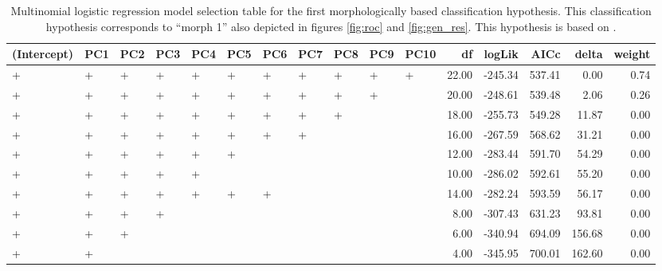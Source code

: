 \documentclass[12pt,letterpaper]{article}\usepackage{graphicx, color}
\begin{document}



\pagebreak

\begin{table}
  \centering
{\small
\begin{tabular}{lllllllllllrrrrr}
  \hline
(Intercept) & PC1 & PC2 & PC3 & PC4 & PC5 & PC6 & PC7 & PC8 & PC9 & PC10 & df & logLik & AICc & delta & weight \\ 
  \hline
+ & + & + & + & + & + & + & + & + & + & + & 22.00 & -245.34 & 537.41 & 0.00 & 0.74 \\ 
  + & + & + & + & + & + & + & + & + & + &  & 20.00 & -248.61 & 539.48 & 2.06 & 0.26 \\ 
  + & + & + & + & + & + & + & + & + &  &  & 18.00 & -255.73 & 549.28 & 11.87 & 0.00 \\ 
  + & + & + & + & + & + & + & + &  &  &  & 16.00 & -267.59 & 568.62 & 31.21 & 0.00 \\ 
  + & + & + & + & + & + &  &  &  &  &  & 12.00 & -283.44 & 591.70 & 54.29 & 0.00 \\ 
  + & + & + & + & + &  &  &  &  &  &  & 10.00 & -286.02 & 592.61 & 55.20 & 0.00 \\ 
  + & + & + & + & + & + & + &  &  &  &  & 14.00 & -282.24 & 593.59 & 56.17 & 0.00 \\ 
  + & + & + & + &  &  &  &  &  &  &  & 8.00 & -307.43 & 631.23 & 93.81 & 0.00 \\ 
  + & + & + &  &  &  &  &  &  &  &  & 6.00 & -340.94 & 694.09 & 156.68 & 0.00 \\ 
  + & + &  &  &  &  &  &  &  &  &  & 4.00 & -345.95 & 700.01 & 162.60 & 0.00 \\ 
   \hline
\end{tabular}
}


\caption{Multinomial logistic regression model selection table for the first morphologically based classification hypothesis. This classification hypothesis corresponds to ``morph 1'' also depicted in figures \ref{fig:roc} and \ref{fig:gen_res}. This hypothesis is based on \citet{Seeliger1945}.}
  \label{tab:mod_sel_1}
\end{table}
\end{document}

